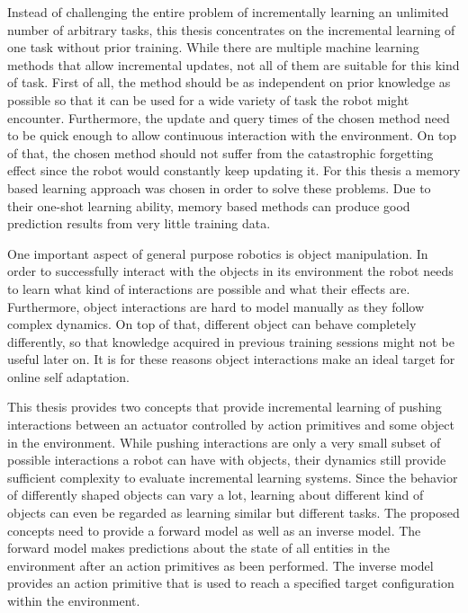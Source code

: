 Instead of challenging the entire problem of incrementally learning an unlimited number of arbitrary tasks, this thesis concentrates on the incremental learning of one task without prior training. 
While there are multiple machine learning methods that allow incremental updates, not all of them are suitable for this kind of task. First of all, the method should be as independent on prior knowledge as possible so that it can be used for a wide variety of task the robot might encounter. Furthermore, the update and query times of the chosen method need to be quick enough to allow continuous interaction with the environment. On top of that, the chosen method should not suffer from the catastrophic forgetting effect since the robot would constantly keep updating it. For this thesis a memory based learning approach was chosen in order to solve these problems. Due to their one-shot learning ability, memory based methods can produce good prediction results from very little training data. 

One important aspect of general purpose robotics is object manipulation. In order to successfully interact with the objects in its environment the robot needs to learn what kind of interactions are possible and what their effects are. 
Furthermore, object interactions are hard to model manually as they follow complex dynamics. On top of that, different object can behave completely differently, so that knowledge acquired in previous training sessions might not be useful later on. It is for these reasons object interactions make an ideal target for online self adaptation. 

This thesis provides two concepts that provide incremental learning of pushing interactions between an actuator controlled by action primitives and some object in the environment.
While pushing interactions are only a very small subset of possible interactions a robot can have with objects, their dynamics still provide sufficient complexity to evaluate incremental learning systems. Since the behavior of differently shaped objects can vary a lot, learning about different kind of objects can even be regarded as learning similar but different tasks.%
The proposed concepts need to provide a forward model as well as an inverse model. The forward model makes predictions about the state of all entities in the environment after an action primitives as been performed. The inverse model provides an action primitive that is used to reach a specified target configuration within the environment.

